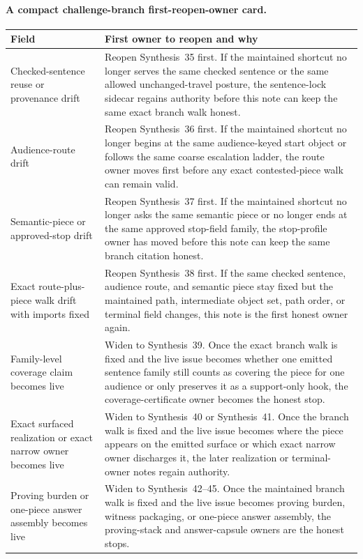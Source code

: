 \documentclass[11pt]{article}
\begin{document}
\paragraph{A compact challenge-branch first-reopen-owner card.}
\begin{table}[t]
\centering
\small
\begin{tabularx}{\linewidth}{@{}lX@{}}
\toprule
Field & First owner to reopen and why \\
\midrule
Checked-sentence reuse or provenance drift & Reopen Synthesis~35 first. If the maintained shortcut no longer serves the same checked sentence or the same allowed unchanged-travel posture, the sentence-lock sidecar regains authority before this note can keep the same exact branch walk honest. \\
Audience-route drift & Reopen Synthesis~36 first. If the maintained shortcut no longer begins at the same audience-keyed start object or follows the same coarse escalation ladder, the route owner moves first before any exact contested-piece walk can remain valid. \\
Semantic-piece or approved-stop drift & Reopen Synthesis~37 first. If the maintained shortcut no longer asks the same semantic piece or no longer ends at the same approved stop-field family, the stop-profile owner has moved before this note can keep the same branch citation honest. \\
Exact route-plus-piece walk drift with imports fixed & Reopen Synthesis~38 first. If the same checked sentence, audience route, and semantic piece stay fixed but the maintained path, intermediate object set, path order, or terminal field changes, this note is the first honest owner again. \\
Family-level coverage claim becomes live & Widen to Synthesis~39. Once the exact branch walk is fixed and the live issue becomes whether one emitted sentence family still counts as covering the piece for one audience or only preserves it as a support-only hook, the coverage-certificate owner becomes the honest stop. \\
Exact surfaced realization or exact narrow owner becomes live & Widen to Synthesis~40 or Synthesis~41. Once the branch walk is fixed and the live issue becomes where the piece appears on the emitted surface or which exact narrow owner discharges it, the later realization or terminal-owner notes regain authority. \\
Proving burden or one-piece answer assembly becomes live & Widen to Synthesis~42--45. Once the maintained branch walk is fixed and the live issue becomes proving burden, witness packaging, or one-piece answer assembly, the proving-stack and answer-capsule owners are the honest stops. \\

\end{tabularx}
\end{table}
\end{document}
